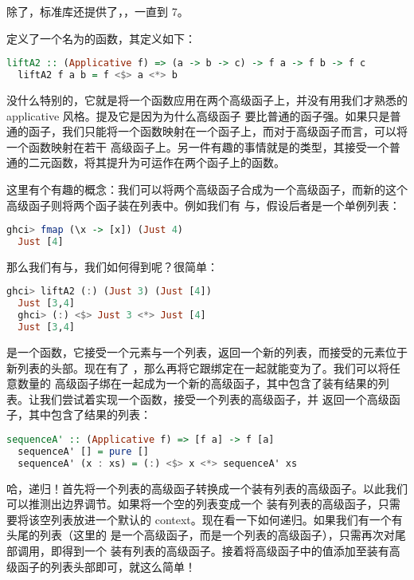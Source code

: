 \documentclass[./main.tex]{subfiles}
\begin{document}
除了，标准库还提供了，，一直到 7。

定义了一个名为的函数，其定义如下：

\begin{lstlisting}[language=Haskell]
  liftA2 :: (Applicative f) => (a -> b -> c) -> f a -> f b -> f c
  liftA2 f a b = f <$> a <*> b
\end{lstlisting}

没什么特别的，它就是将一个函数应用在两个高级函子上，并没有用我们才熟悉的 applicative 风格。提及它是因为为什么高级函子
要比普通的函子强。如果只是普通的函子，我们只能将一个函数映射在一个函子上，而对于高级函子而言，可以将一个函数映射在若干
高级函子上。另一件有趣的事情就是的类型，其接受一个普通的二元函数，将其提升为可运作在两个函子上的函数。

这里有个有趣的概念：我们可以将两个高级函子合成为一个高级函子，而新的这个高级函子则将两个函子装在列表中。例如我们有
与，假设后者是一个单例列表：

\begin{lstlisting}[language=Haskell]
  ghci> fmap (\x -> [x]) (Just 4)
  Just [4]
\end{lstlisting}

那么我们有与，我们如何得到呢？很简单：

\begin{lstlisting}[language=Haskell]
  ghci> liftA2 (:) (Just 3) (Just [4])
  Just [3,4]
  ghci> (:) <$> Just 3 <*> Just [4]
  Just [3,4]
\end{lstlisting}

\acode{:}是一个函数，它接受一个元素与一个列表，返回一个新的列表，而接受的元素位于新列表的头部。现在有了
，那么再将它跟绑定在一起就能变为了。我们可以将任意数量的
高级函子绑在一起成为一个新的高级函子，其中包含了装有结果的列表。让我们尝试着实现一个函数，接受一个列表的高级函子，并
返回一个高级函子，其中包含了结果的列表：

\begin{lstlisting}[language=Haskell]
  sequenceA' :: (Applicative f) => [f a] -> f [a]
  sequenceA' [] = pure []
  sequenceA' (x : xs) = (:) <$> x <*> sequenceA' xs
\end{lstlisting}

哈，递归！首先将一个列表的高级函子转换成一个装有列表的高级函子。以此我们可以推测出边界调节。如果将一个空的列表变成一个
装有列表的高级函子，只需要将该空列表放进一个默认的 context。现在看一下如何递归。如果我们有一个有头尾的列表（这里的
是一个高级函子，而是一个列表的高级函子），只需再次对尾部调用，即得到一个
装有列表的高级函子。接着将高级函子中的值添加至装有高级函子的列表头部即可，就这么简单！
\end{document}
